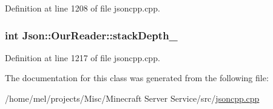 Definition at line 1208 of file jsoncpp.\+cpp.

\subsubsection[{\texorpdfstring{stack\+Depth\+\_\+}{stackDepth_}}]{\setlength{\rightskip}{0pt plus 5cm}int Json\+::\+Our\+Reader\+::stack\+Depth\+\_\+\hspace{0.3cm}{\ttfamily [private]}}\hypertarget{class_json_1_1_our_reader_aaa91c93bc064c7086248ea01eddcf51a}{}\label{class_json_1_1_our_reader_aaa91c93bc064c7086248ea01eddcf51a}


Definition at line 1217 of file jsoncpp.\+cpp.



The documentation for this class was generated from the following file\+:\begin{DoxyCompactItemize}
\item 
/home/mel/projects/\+Misc/\+Minecraft Server Service/src/\hyperlink{jsoncpp_8cpp}{jsoncpp.\+cpp}\end{DoxyCompactItemize}

